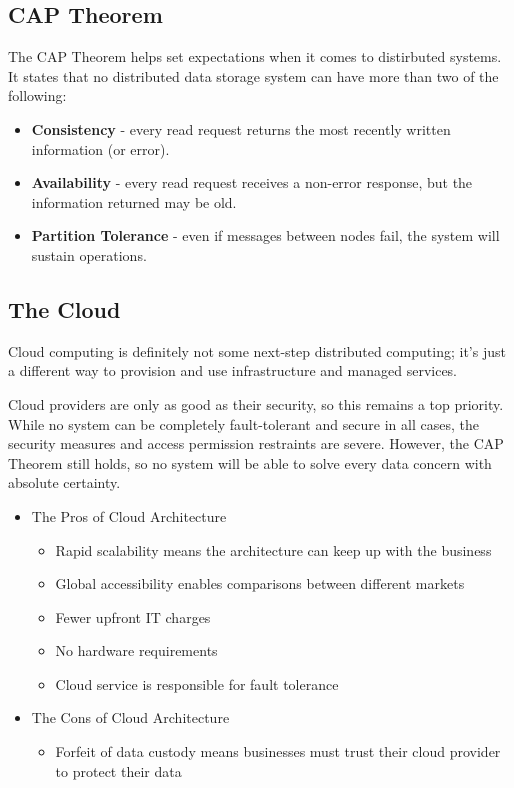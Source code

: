 \documentclass[12pt,a4paper]{article}
\begin{document}
\subsection{CAP Theorem}

The CAP Theorem helps set expectations when it comes to distirbuted systems. It states that no distributed data storage system can have more than two of the following:

\begin{itemize}
	\item \textbf{Consistency} - every read request returns the most recently written information (or error).
	\item \textbf{Availability} - every read request receives a non-error response, but the information returned may be old.
	\item \textbf{Partition Tolerance} - even if messages between nodes fail, the system will sustain operations.
\end{itemize}

\subsection{The Cloud}

Cloud computing is definitely not some next-step distributed computing;
it's just a different way to provision and use infrastructure and managed services.


Cloud providers are only as good as their security,
so this remains a top priority. While no system can
be completely fault-tolerant and secure in all cases,
the security measures and access permission
restraints are severe. However, the CAP Theorem
still holds, so no system will be able to solve every
data concern with absolute certainty.

\begin{itemize}
	\item The Pros of Cloud Architecture
		\begin{itemize}
			\item Rapid scalability means the architecture can keep up with the business
			\item Global accessibility enables comparisons between different markets
			\item Fewer upfront IT charges
			\item No hardware requirements
			\item Cloud service is responsible for fault tolerance
		\end{itemize}

	\item The Cons of Cloud Architecture

		\begin{itemize}
\item Forfeit of data custody means businesses must 
	trust their cloud provider to protect their data
		\end{itemize}

\end{itemize}
\end{document}
